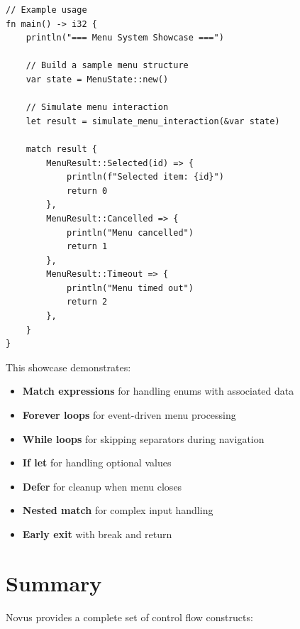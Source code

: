 \begin{lstlisting}
// Example usage
fn main() -> i32 {
    println("=== Menu System Showcase ===")

    // Build a sample menu structure
    var state = MenuState::new()

    // Simulate menu interaction
    let result = simulate_menu_interaction(&var state)

    match result {
        MenuResult::Selected(id) => {
            println(f"Selected item: {id}")
            return 0
        },
        MenuResult::Cancelled => {
            println("Menu cancelled")
            return 1
        },
        MenuResult::Timeout => {
            println("Menu timed out")
            return 2
        },
    }
}
\end{lstlisting}

This showcase demonstrates:
\begin{itemize}
    \item \textbf{Match expressions} for handling enums with associated data
    \item \textbf{Forever loops} for event-driven menu processing
    \item \textbf{While loops} for skipping separators during navigation
    \item \textbf{If let} for handling optional values
    \item \textbf{Defer} for cleanup when menu closes
    \item \textbf{Nested match} for complex input handling
    \item \textbf{Early exit} with break and return
\end{itemize}

\section{Summary}
\label{sec:control-flow-summary}

Novus provides a complete set of control flow constructs:


